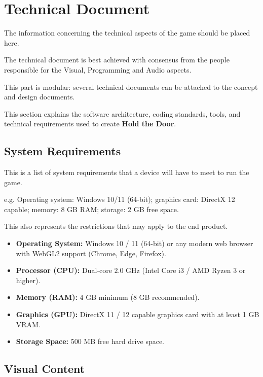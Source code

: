 \section{Technical Document}

\begin{guidance}
The information concerning the technical aspects of the game should be placed here.

The technical document is best achieved with consensus from the people responsible for the Visual, Programming and Audio aspects.

This part is modular: several technical documents can be attached to the concept and design documents.
\end{guidance}
This section explains the software architecture, coding standards, tools, and technical requirements used to create \textbf{Hold the Door}.

\subsection{System Requirements}

\begin{guidance}
This is a list of system requirements that a device will have to meet to run the game.

e.g. Operating system: Windows 10/11 (64-bit); graphics card: DirectX 12 capable; memory: 8 GB RAM; storage: 2 GB free space.

This also represents the restrictions that may apply to the end product.
\end{guidance}
\begin{itemize}[label=\textbullet]
  \item \textbf{Operating System:} Windows 10 / 11 (64-bit) or any modern web browser with WebGL2 support (Chrome, Edge, Firefox).
  \item \textbf{Processor (CPU):} Dual-core $2.0\text{ GHz}$ (Intel Core i3 / AMD Ryzen 3 or higher).
  \item \textbf{Memory (RAM):} 4 GB minimum (8 GB recommended).
  \item \textbf{Graphics (GPU):} DirectX 11 / 12 capable graphics card with at least 1 GB VRAM.
  \item \textbf{Storage Space:} 500 MB free hard drive space.
\end{itemize}

\subsection{Visual Content}

